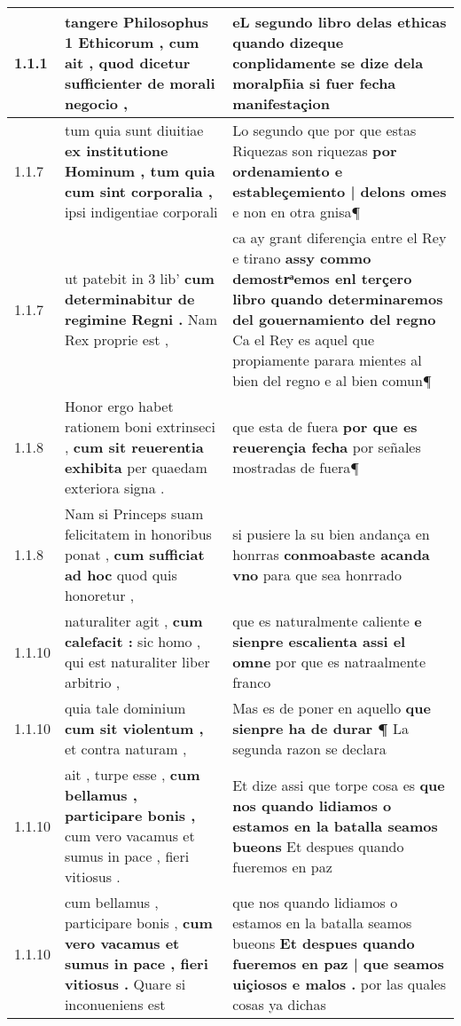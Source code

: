 \begin{tabular}{|p{1cm}|p{6.5cm}|p{6.5cm}|}

\hline
1.1.1 & tangere Philosophus 1 Ethicorum , \textbf{ cum ait , } quod dicetur sufficienter de morali negocio , & eL segundo libro delas ethicas quando \textbf{ dizeque conplidamente se dize dela } moralph̃ia si fuer fecha manifestaçion \\\hline
1.1.7 & tum quia sunt diuitiae \textbf{ ex institutione Hominum , tum quia cum sint corporalia , } ipsi indigentiae corporali & Lo segundo que por que estas Riquezas son riquezas \textbf{ por ordenamiento e estableçemiento | delons omes } e non en otra gnisa¶ \\\hline
1.1.7 & ut patebit in 3 lib’ \textbf{ cum determinabitur de regimine Regni . } Nam Rex proprie est , & ca ay grant diferençia entre el Rey e tirano \textbf{ assy commo demostrͣemos enl terçero libro quando determinaremos del gouernamiento del regno } Ca el Rey es aquel que propiamente parara mientes al bien del regno e al bien comun¶ \\\hline
1.1.8 & Honor ergo habet rationem boni extrinseci , \textbf{ cum sit reuerentia exhibita } per quaedam exteriora signa . & que esta de fuera \textbf{ por que es reuerençia fecha } por señales mostradas de fuera¶ \\\hline
1.1.8 & Nam si Princeps suam felicitatem in honoribus ponat , \textbf{ cum sufficiat ad hoc } quod quis honoretur , & si pusiere la su bien andança en honrras \textbf{ conmoabaste acanda vno } para que sea honrrado \\\hline
1.1.10 & naturaliter agit , \textbf{ cum calefacit : } sic homo , qui est naturaliter liber arbitrio , & que es naturalmente caliente \textbf{ e sienpre escalienta assi el omne } por que es natraalmente franco \\\hline
1.1.10 & quia tale dominium \textbf{ cum sit violentum , } et contra naturam , & Mas es de poner en aquello \textbf{ que sienpre ha de durar ¶ } La segunda razon se declara \\\hline
1.1.10 & ait , turpe esse , \textbf{ cum bellamus , participare bonis , } cum vero vacamus et sumus in pace , fieri vitiosus . & Et dize assi que torpe cosa es \textbf{ que nos quando lidiamos o estamos en la batalla seamos bueons } Et despues quando fueremos en paz \\\hline
1.1.10 & cum bellamus , participare bonis , \textbf{ cum vero vacamus et sumus in pace , fieri vitiosus . } Quare si inconueniens est & que nos quando lidiamos o estamos en la batalla seamos bueons \textbf{ Et despues quando fueremos en paz | que seamos uiçiosos e malos . } por las quales cosas ya dichas \\\hline

\end{tabular}
